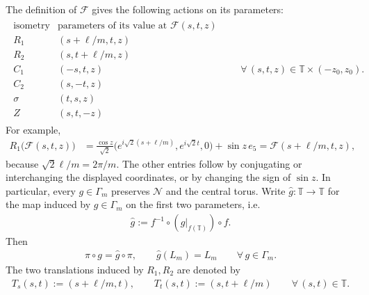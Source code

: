 \documentclass[a4paper,11pt,oneside,reqno]{amsart}
\numberwithin{equation}{section}
\theoremstyle{definition}
\begin{document}
The definition of $\mathcal F$ gives the following actions
on its parameters:
%
\begin{align*}
    \begin{array}{c|c}
        \text{isometry}&
        \text{parameters of its value at }\mathcal F(s,t,z)\\ \hline
        R_1&(s+\ell/m,t,z)\\
        R_2&(s,t+\ell/m,z)\\
        C_1&(-s,t,z)\\
        C_2&(s,-t,z)\\
        \sigma&(t,s,z)\\
        Z&(s,t,-z)
    \end{array}
    \qquad
    \forall\,(s,t,z)\in\mathbb T\times(-z_0,z_0).
\end{align*}
%
For example,
%
\begin{align*}
    R_1\bigl(\mathcal F(s,t,z)\bigr)
    &=
    \frac{\cos z}{\sqrt2}
    \bigl(e^{i\sqrt2(s+\ell/m)},e^{i\sqrt2t},0\bigr)
    +\sin z\,e_5=\mathcal F(s+\ell/m,t,z),
\end{align*}
%
because $\sqrt2\ell/m=2\pi/m$. The other entries follow
by conjugating or interchanging the displayed coordinates,
or by changing the sign of $\sin z$.
In particular, every $g\in\Gamma_m$ preserves $\mathcal N$
and the central torus. Write $\widehat g:\mathbb T\to\mathbb T$
for the map induced by $g\in\Gamma_m$ on the first two parameters, i.e.
%
\begin{align*}
    \hat g:=f^{-1}\circ (g|_{f(\mathbb{T})})\circ f. 
\end{align*}
%
Then
%
\begin{align*}
    \pi\circ g=\widehat g\circ\pi,
    \qquad
    \widehat g(L_m)=L_m
    \qquad\forall\,g\in\Gamma_m.
\end{align*}
%
The two translations induced by $R_1,R_2$ are denoted by
%
\begin{align*}
    T_s(s,t):=(s+\ell/m,t),\qquad
    T_t(s,t):=(s,t+\ell/m)
    \qquad\forall\,(s,t)\in\mathbb T.
\end{align*}
%
\end{document}
